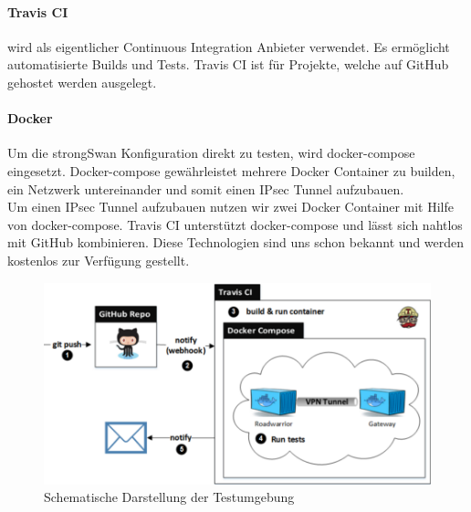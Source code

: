 \paragraph{Travis CI} wird als eigentlicher Continuous Integration Anbieter verwendet. Es ermöglicht automatisierte Builds und Tests. Travis CI ist für Projekte, welche auf GitHub gehostet werden ausgelegt.

\paragraph{Docker} Um die strongSwan Konfiguration direkt zu testen, wird docker-compose eingesetzt. Docker-compose gewährleistet mehrere Docker Container zu builden, ein Netzwerk untereinander und somit einen IPsec Tunnel aufzubauen. \\
Um einen IPsec Tunnel aufzubauen nutzen wir zwei Docker Container mit Hilfe von docker-compose. Travis CI unterstützt docker-compose und lässt sich nahtlos mit GitHub kombinieren. Diese Technologien sind uns schon bekannt und werden kostenlos zur Verfügung gestellt.

\begin{figure}[H]
\centering
\includegraphics[width=420pt]{images/testing.png}
\caption[Schematische Darstellung der Testumgebung]{Schematische Darstellung der Testumgebung}
\end{figure}
